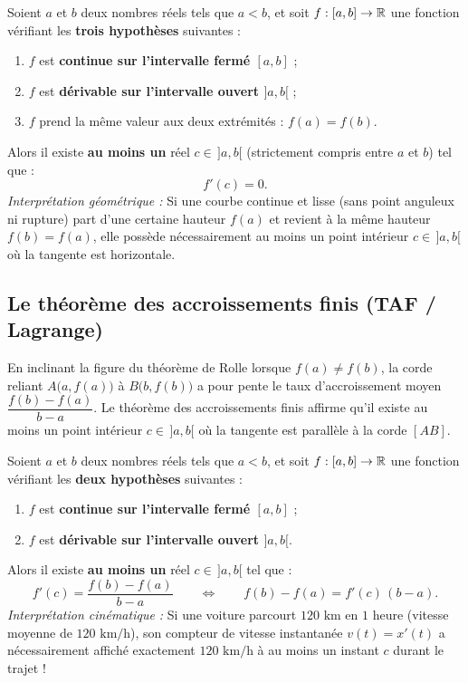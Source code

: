 \begin{theoreme}
Soient $a$ et $b$ deux nombres réels tels que $a < b$, et soit $f : [a, b] \to \mathbb{R}$ une fonction vérifiant les \textbf{trois hypothèses} suivantes :
\begin{enumerate}
    \item $f$ est \textbf{continue sur l'intervalle fermé $[a, b]$} ;
    \item $f$ est \textbf{dérivable sur l'intervalle ouvert $]a, b[$} ;
    \item $f$ prend la même valeur aux deux extrémités : $\boxed{f(a) = f(b)}$.
\end{enumerate}
Alors il existe \textbf{au moins un} réel $c \in \,]a, b[$ (strictement compris entre $a$ et $b$) tel que :
\[
    \boxed{f'(c) = 0}.
\]
\emph{Interprétation géométrique :} Si une courbe continue et lisse (sans point anguleux ni rupture) part d'une certaine hauteur $f(a)$ et revient à la même hauteur $f(b) = f(a)$, elle possède nécessairement au moins un point intérieur $c \in \,]a, b[$ où la tangente est horizontale.
\end{theoreme}

\subsection{Le théorème des accroissements finis (TAF / Lagrange)}

En inclinant la figure du théorème de Rolle lorsque $f(a) \neq f(b)$, la corde reliant $A\bigl(a, f(a)\bigr)$ à $B\bigl(b, f(b)\bigr)$ a pour pente le taux d'accroissement moyen $\dfrac{f(b) - f(a)}{b - a}$. Le théorème des accroissements finis affirme qu'il existe au moins un point intérieur $c \in \,]a, b[$ où la tangente est parallèle à la corde $[AB]$.

\begin{theoreme}
Soient $a$ et $b$ deux nombres réels tels que $a < b$, et soit $f : [a, b] \to \mathbb{R}$ une fonction vérifiant les \textbf{deux hypothèses} suivantes :
\begin{enumerate}
    \item $f$ est \textbf{continue sur l'intervalle fermé $[a, b]$} ;
    \item $f$ est \textbf{dérivable sur l'intervalle ouvert $]a, b[$}.
\end{enumerate}
Alors il existe \textbf{au moins un} réel $c \in \,]a, b[$ tel que :
\[
    \boxed{f'(c) = \frac{f(b) - f(a)}{b - a}} \qquad \Longleftrightarrow \qquad \boxed{f(b) - f(a) = f'(c)\,(b - a)}.
\]
\emph{Interprétation cinématique :} Si une voiture parcourt $120\text{ km}$ en $1\text{ heure}$ (vitesse moyenne de $120\text{ km/h}$), son compteur de vitesse instantanée $v(t) = x'(t)$ a nécessairement affiché exactement $120\text{ km/h}$ à au moins un instant $c$ durant le trajet !
\end{theoreme}

